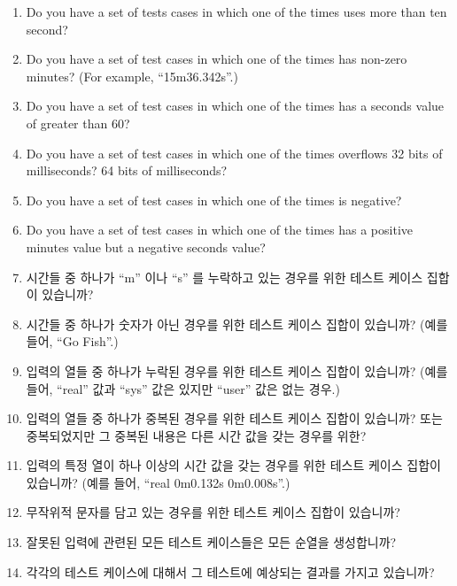 {\begin{enumerate}
	\item	Do you have a set of tests cases in which one of the
		times uses more than ten second?
	\item	Do you have a set of test cases in which one of the
		times has non-zero minutes?  (For example, ``15m36.342s''.)
	\item	Do you have a set of test cases in which one of the
		times has a seconds value of greater than 60?
	\item	Do you have a set of test cases in which one of the
		times overflows 32 bits of milliseconds?  64 bits of
		milliseconds?
	\item	Do you have a set of test cases in which one of the
		times is negative?
	\item	Do you have a set of test cases in which one of the
		times has a positive minutes value but a negative
		seconds value?
	\fi
	\item	시간들 중 하나가 ``m'' 이나 ``s'' 를 누락하고 있는 경우를 위한
		테스트 케이스 집합이 있습니까?
	\item	시간들 중 하나가 숫자가 아닌 경우를 위한 테스트 케이스 집합이
		있습니까? (예를 들어, ``Go Fish''.)
	\item	입력의 열들 중 하나가 누락된 경우를 위한 테스트 케이스 집합이
		있습니까? (예를 들어, ``real'' 값과 ``sys'' 값은 있지만
		``user'' 값은 없는 경우.)
	\item	입력의 열들 중 하나가 중복된 경우를 위한 테스트 케이스 집합이
		있습니까? 또는 중복되었지만 그 중복된 내용은 다른 시간 값을
		갖는 경우를 위한?
	\item	입력의 특정 열이 하나 이상의 시간 값을 갖는 경우를 위한 테스트
		케이스 집합이 있습니까? (예를 들어, ``real 0m0.132s
		0m0.008s''.)
	\item	무작위적 문자를 담고 있는 경우를 위한 테스트 케이스 집합이
		있습니까?
	\item	잘못된 입력에 관련된 모든 테스트 케이스들은 모든 순열을
		생성합니까?
	\item	각각의 테스트 케이스에 대해서 그 테스트에 예상되는 결과를
		가지고 있습니까?
	\iffalse


\end{enumerate}}
